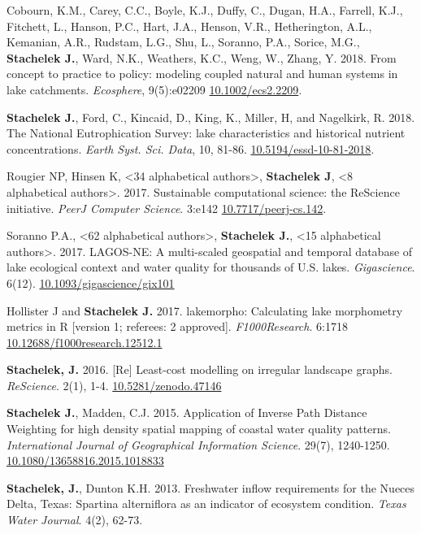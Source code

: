 \documentclass[11pt]{article}
\makeatletter
\newlength{\bibhang}
\newlength{\bibsep}
 {\@listi \global\bibsep\itemsep \global\advance\bibsep by\parsep}
\newenvironment{bibenum*}
  {\renewcommand\labelenumi{[\theenumi]}%
   \etaremune[
     topsep=0pt,
     itemsep=\bibsep,
     parsep=0pt,partopsep=0pt,
     itemindent=-\bibhang,
     leftmargin={\bibhang+\widthof{[999]}}]}
  {\endetaremune}
\makeatother
\begin{document}
\begin{bibenum*}
  \item Cobourn, K.M., Carey, C.C., Boyle, K.J., Duffy, C., Dugan, H.A., Farrell, K.J., Fitchett, L., Hanson, P.C., Hart, J.A., Henson, V.R., Hetherington, A.L., Kemanian, A.R., Rudstam, L.G., Shu, L., Soranno, P.A., Sorice, M.G., \textbf{Stachelek J.}, Ward, N.K., Weathers, K.C., Weng, W., Zhang, Y. 2018. From concept to practice to policy: modeling coupled natural and human systems in lake catchments. \emph{Ecosphere}, 9(5):e02209 \href{https://doi.org/10.1002/ecs2.2209}{10.1002/ecs2.2209}.

  \item \textbf{Stachelek J.}, Ford, C., Kincaid, D., King, K., Miller, H, and Nagelkirk, R. 2018. The National Eutrophication Survey: lake characteristics and historical nutrient concentrations. \emph{Earth Syst. Sci. Data}, 10, 81-86. \href{https://doi.org/10.5194/essd-10-81-2018}{10.5194/essd-10-81-2018}.

    \item Rougier NP, Hinsen K, <34 alphabetical authors>, \textbf{Stachelek J}, <8 alphabetical authors>. 2017. Sustainable computational science: the ReScience initiative. \emph{PeerJ Computer Science}. 3:e142 \href{https://doi.org/10.7717/peerj-cs.142}{10.7717/peerj-cs.142}.

    \item Soranno P.A., <62 alphabetical authors>, \textbf{Stachelek J.}, <15 alphabetical authors>. 2017. LAGOS-NE: A multi-scaled geospatial and temporal database of lake ecological context and water quality for thousands of U.S. lakes. \emph{Gigascience}. 6(12). \href{https://doi.org/10.1093/gigascience/gix101}{10.1093/gigascience/gix101}
    
    \item Hollister J and \textbf{Stachelek J.} 2017. lakemorpho: Calculating lake morphometry metrics in R [version 1; referees: 2 approved]. \emph{F1000Research}. 6:1718 \href{https://doi.org/10.12688/f1000research.12512.1}{10.12688/f1000research.12512.1}

    \item \textbf{Stachelek, J.} 2016. [Re] Least-cost modelling on irregular landscape graphs. \emph{ReScience}. 2(1), 1-4. \href{https://jsta.rbind.io/pdf/2016_stachelek_rescience.pdf}{10.5281/zenodo.47146}
   
    \item \textbf{Stachelek J.}, Madden, C.J. 2015. Application of Inverse Path Distance Weighting for high density spatial mapping of coastal water quality patterns. \emph{International Journal of Geographical Information Science}.  29(7), 1240-1250. \href{https://jsta.rbind.io/pdf/stachmadden2015am.pdf}{10.1080/13658816.2015.1018833}
   
    \item \textbf{Stachelek, J.}, Dunton K.H. 2013. Freshwater inflow requirements for the Nueces Delta, Texas: Spartina alterniflora as an indicator of ecosystem condition. \emph{Texas Water Journal}. 4(2), 62-73. %
  
\end{bibenum*}
\end{document}
